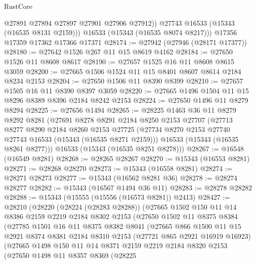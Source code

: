 \begin{lexlean}{RustCore}
\begin{coremodule}
            @27891
            @27894
            @27897
            @27901
            @27906
            @27912))
        @27743
        @16533
        (@15343 (@16535 @8131 @2159)))
      @16533
      (@15343 (@16535 @8074 @8217)))
    @17356
    @17359
    @17362
    @17366
    @17371
@28174 := @27942 (@27946 (@28171 @17377))
@28180 := @27642 @1526 @267 @11 @15 @8619 @4162
@28184 := @27650 @1526 @11 @8608 @8617
@28190 := @27657 @1525 @16 @11 @8608 @8615 @3059
@28200 := @27665 @1506 @1524 @11 @15 @8401 @8607 @8614 @2184 @8234 @2153
@28204 := @27650 @1506 @11 @8390 @8399
@28210 := @27657 @1505 @16 @11 @8390 @8397 @3059
@28220 := @27665 @1496 @1504 @11 @15 @8296 @8389 @8396 @2184 @8242 @2153
@28224 := @27650 @1496 @11 @8279 @8294
@28225 := @27656 @1494
@28265 := @28225
    @1463
    @36
    @11
    @8279
    @8292
    @8281
    (@27691
      @8278
      @8291
      @2184
      @8250
      @2153
      @27707
      (@27713
        @8277
        @8290
        @2184
        @8260
        @2153
        @27725
        (@27734 @8270 @2153 @27740 @27743 @16533 (@15343 (@16535 @8271 @2159)))
        @16533
        (@15343 (@16535 @8261 @8277)))
      @16533
      (@15343 (@16535 @8251 @8278)))
@28267 := @16548 (@16549 @8281)
@28268 := @28265 @28267
@28270 := @15343 (@16553 @8281)
@28271 := @28268 @28270
@28273 := @15343 (@16558 @8281)
@28274 := @28271 @28273
@28277 := @15343 (@16562 @8281 @36)
@28278 := @28274 @28277
@28282 := @15343 (@16567 @1494 @36 @11)
@28283 := @28278 @28282
@28288 := @15343 (@15555 (@15556 (@16573 @8281)) @2413)
@28427 := @28210
    (@28220
      (@28224 (@28283 @28288))
      (@27665
        @1502
        @150
        @11
        @14
        @8386
        @2159
        @2219
        @2184
        @8302
        @2153
        (@27650
          @1502
          @11
          @8375
          @8384
          (@27785
            @1501
            @16
            @11
            @8375
            @8382
            @8041
            (@27665
              @866
              @1500
              @11
              @15
              @2921
              @8374
              @8381
              @2184
              @8310
              @2153
              (@27721 @865 @2921 @16919 @16923)
              (@27665
                @1498
                @150
                @11
                @14
                @8371
                @2159
                @2219
                @2184
                @8320
                @2153
                (@27650
                  @1498
                  @11
                  @8357
                  @8369
                  (@28225

\end{coremodule}
\end{lexlean}
